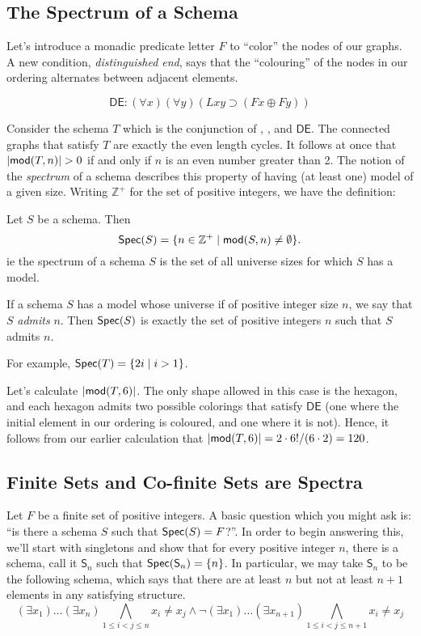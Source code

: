 \subsection{The Spectrum of a Schema}
Let's introduce a monadic predicate letter $F$ to ``color'' the nodes of our graphs. A new condition, \emph{distinguished end}, says that the ``colouring'' of the nodes in our ordering alternates between adjacent elements. 

\[
  \mathsf{DE}: (\forall x)(\forall y)(Lxy\supset (Fx\oplus Fy))  
\]

Consider the schema $T$ which is the conjunction of \sg, \twor, and $\mathsf{DE}$. The connected graphs that satisfy $T$ are exactly the even length cycles. It follows at once that $\mbox{$|\mbox{$\mathsf {mod}(T,n)$}|$}>0$ if and only if $n$ is an even number greater than 2. The notion of the \emph{spectrum} of a schema describes this property of having (at least one) model of a given size. Writing $\mathbb{Z}^+$ for the set of positive integers, we have the definition:


\begin{definition}
Let $S$ be a schema. Then 
\[
\mbox{$\mathsf{Spec}(S)$}=\{n\in \mathbb{Z}^+\mid \mbox{$\mathsf {mod}(S,n)$}\neq\emptyset\}.
\]
ie the spectrum of a schema $S$ is the set of all universe sizes for which $S$ has a model. 

If a schema $S$ has a model whose universe if of positive integer size $n$, we say that $S$ \emph{admits} $n$. Then $\mbox{$\mathsf{Spec}(S)$}$ is exactly the set of positive integers $n$ such that $S$ admits $n$.
\end{definition}

For example, $\mbox{$\mathsf{Spec}(T)$}=\{2i\mid i>1\}$.

Let's calculate $\mbox{$|\mbox{$\mathsf {mod}(T,6)$}|$}$. The only shape allowed in this case is the hexagon, and each hexagon admits two possible colorings that satisfy $\mathsf{DE}$ (one where the initial element in our ordering is coloured, and one where it is not). Hence, it follows from our earlier calculation that $\mbox{$|\mbox{$\mathsf {mod}(T,6)$}|$}=2\cdot6!/(6\cdot2)=120$.

 
\subsection*{Finite Sets and Co-finite Sets are Spectra}

Let $F$ be a finite set of positive integers. A basic question which you might ask is: ``is there a schema $S$ such that $\mbox{$\mathsf{Spec}(S)$}=F$?''. In order to begin answering this, we'll start with singletons and show that for every positive integer $n$, there is a schema, call it $\mathsf{S}_n$  such that $\mbox{$\mathsf{Spec}(\mathsf{S}_n)$}=\{n\}$. In particular, we may take $\mathsf{S}_n$ to be the following schema, which says that there are at least $n$ but not at least $n + 1$ elements in any satisfying structure. 
\[
(\exists x_1)\ldots(\exists x_n)\bigwedge_{1\leq i<j\leq n}x_i\neq x_j\wedge \neg(\exists x_1)\ldots(\exists x_{n+1})\bigwedge_{1\leq i<j\leq n+1}x_i\neq x_j
\]

